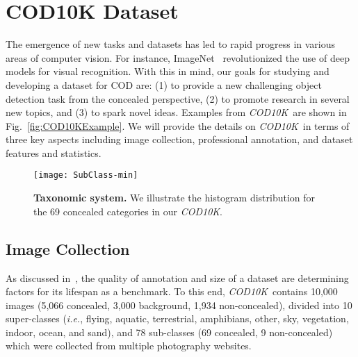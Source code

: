 \documentclass[10pt,journal,compsoc]{IEEEtran}
\def\ie{\emph{i.e.}}
\newcommand{\figref}[1]{Fig.~\ref{#1}}
\def\ourdataset{\textit{COD10K}}
\begin{document}
\section{COD10K Dataset}\label{sec:CODdataset}

The emergence of new tasks and datasets
\cite{cordts2016cityscapes,zhou2017scene,neuhold2017mapillary} 
has led to rapid progress in various areas of computer vision.
For instance, ImageNet~\cite{russakovsky2015imagenet} revolutionized 
the use of deep models for visual recognition.
With this in mind, our goals for studying and developing a dataset for COD are:
(1) to provide a new challenging object detection task from the concealed 
perspective,
(2) to promote research in several new topics, and
(3) to spark novel ideas.
Examples from \ourdataset~are shown in \figref{fig:COD10KExample}. 
We will provide the details on \ourdataset~in terms of three key aspects
including image collection, professional annotation, and dataset features 
and statistics.



\begin{figure}[t!]
  \centering
  \texttt{[image: SubClass-min]}\\
  \vspace{-18pt}
  \caption{\textbf{Taxonomic system.} We illustrate the histogram distribution 
    for the 69 concealed categories in our \ourdataset.
  }\label{fig:SubClassSystem}
\end{figure}



\subsection{Image Collection}

As discussed in~\cite{perazzi2016benchmark,wang2018revisiting,Fan2021SOC},
the quality of annotation and size of a dataset are determining factors for its
lifespan as a benchmark.
To this end, \ourdataset~contains 10,000 images (5,066 concealed, 
3,000 background, 1,934 non-concealed), 
divided into 10 super-classes (\ie, flying, aquatic, terrestrial, 
amphibians, other, sky, vegetation, indoor, ocean, and sand), 
and 78 sub-classes (69 concealed, 9 non-concealed) 
which were collected from multiple photography websites.
\end{document}
